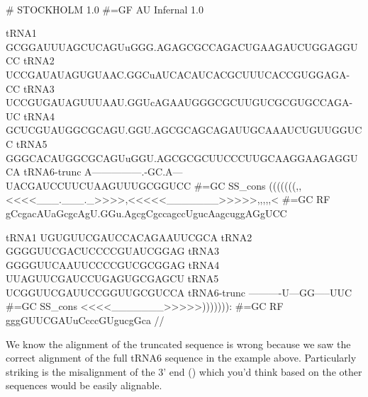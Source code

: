 \\

{\samepage
\begin{sreoutput}
# STOCKHOLM 1.0
#=GF AU Infernal 1.0

tRNA1        GCGGAUUUAGCUCAGUuGGG.AGAGCGCCAGACUGAAGAUCUGGAGGUCC
tRNA2        UCCGAUAUAGUGUAAC.GGCuAUCACAUCACGCUUUCACCGUGGAGA-CC
tRNA3        UCCGUGAUAGUUUAAU.GGUcAGAAUGGGCGCUUGUCGCGUGCCAGA-UC
tRNA4        GCUCGUAUGGCGCAGU.GGU.AGCGCAGCAGAUUGCAAAUCUGUUGGUCC
tRNA5        GGGCACAUGGCGCAGUuGGU.AGCGCGCUUCCCUUGCAAGGAAGAGGUCA
tRNA6-trunc  A---------------.-GC.A---UACGAUCCUUCUAAGUUUGCGGUCC
#=GC SS_cons (((((((,,<<<<___.___._>>>>,<<<<<_______>>>>>,,,,,<
#=GC RF      gCcgacAUaGcgcAgU.GGu.AgcgCgccagccUgucAagcuggAGgUCC

tRNA1        UGUGUUCGAUCCACAGAAUUCGCA
tRNA2        GGGGUUCGACUCCCCGUAUCGGAG
tRNA3        GGGGUUCAAUUCCCCGUCGCGGAG
tRNA4        UUAGUUCGAUCCUGAGUGCGAGCU
tRNA5        UCGGUUCGAUUCCGGUUGCGUCCA
tRNA6-trunc  ----------U---GG-----UUC
#=GC SS_cons <<<<_______>>>>>))))))):
#=GC RF      gggGUUCGAUuCcccGUgucgGca
//
\end{sreoutput}
}

We know the alignment of the truncated sequence
 is wrong because we saw the correct alignment
of the full tRNA6 sequence in the example above. Particularly striking
is the misalignment of the 3' end () which you'd think
based on the other sequences would be easily alignable.

